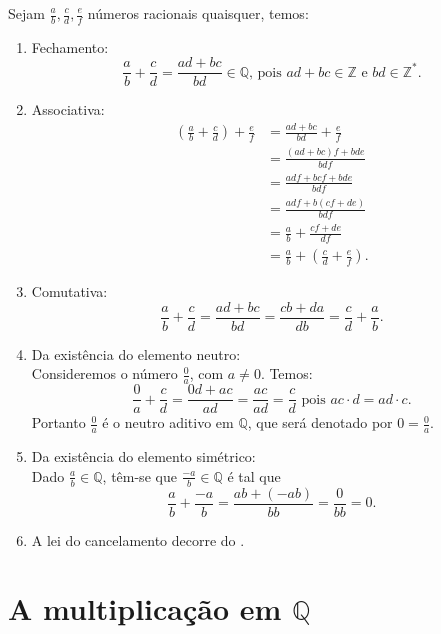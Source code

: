 \documentclass[../main.tex]{subfiles}
\begin{document}
\begin{dem}
    Sejam $\frac{a}{b}, \frac{c}{d}, \frac{e}{f}$ números racionais quaisquer, temos:
    \begin{enumerate}[label=(\roman*)]
        \item Fechamento: \\
        \[ \frac{a}{b}+ \frac{c}{d} = \frac{ad+bc}{bd} \in \mathbb{Q} \text{, pois }ad+bc \in \mathbb{Z}\text{ e }bd \in \mathbb{Z}^*. \]
        \item Associativa: \\
        \begin{align*}
            \left( \frac{a}{b} + \frac{c}{d} \right) + \frac{e}{f} 
            &= \frac{ad+bc}{bd} + \frac{e}{f} \\
            &= \frac{(ad+bc)f + bde}{bdf} \\
            &= \frac{adf + bcf + bde}{bdf} \\
            &= \frac{adf+b(cf+de)}{bdf} \\
            &= \frac{a}{b} + \frac{cf+de}{df} \\
            &= \frac{a}{b} + \left( \frac{c}{d} + \frac{e}{f} \right).
        \end{align*}
        
        \item Comutativa:
        \[ \frac{a}{b} + \frac{c}{d} = \frac{ad+bc}{bd} = \frac{cb + da}{db} = \frac{c}{d} + \frac{a}{b}. \]
        \item Da existência do elemento neutro: \\ 
        Consideremos o número $\frac{0}{a}$, com $a \neq 0$. Temos:
        \[ \frac{0}{a} + \frac{c}{d} = \frac{0d+ac}{ad} = \frac{ac}{ad} = \frac{c}{d} \text{ pois } ac \cdot d = ad \cdot c.\]
        Portanto $\frac{0}{a}$ é o neutro aditivo em $\mathbb{Q}$, que será denotado por $0 = \frac{0}{a}$.
        \item Da existência do elemento simétrico: \\
        Dado $\frac{a}{b} \in \mathbb{Q}$, têm-se que $\frac{-a}{b} \in \mathbb{Q}$ é tal que
        \[ \frac{a}{b} + \frac{-a}{b} = \frac{ab + (-ab)}{bb} = \frac{0}{bb} = 0.\]
        \item A  lei do cancelamento decorre do .
    \end{enumerate}
\end{dem}


\section{A multiplicação em $\mathbb{Q}$}
\end{document}
